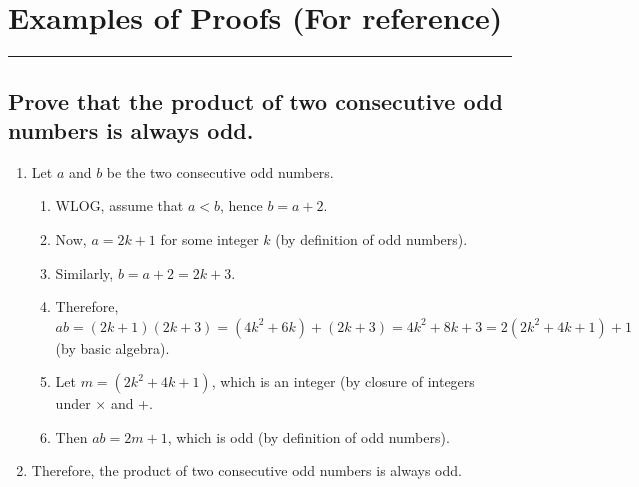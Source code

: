 \documentclass{article}
\begin{document}
\begin{description}
\end{description}

	 
\newpage
\begingroup

\renewcommand{\labelenumii}{\arabic{enumi}.\arabic{enumii}}
\renewcommand{\labelenumiii}{\arabic{enumi}.\arabic{enumii}.\arabic{enumiii}}
\renewcommand{\labelenumiv}{\arabic{enumi}.\arabic{enumii}.\arabic{enumiii}.\arabic{enumiv}}

\section*{Examples of Proofs (For reference)}
\hrule
\vspace{0.5cm}



\subsection*{Prove that the product of two consecutive odd numbers is always odd.}
\begin{enumerate}
    \item Let $a$ and $b$ be the two consecutive odd numbers. 
    \begin{enumerate}
        \item WLOG, assume that $a<b$, hence $b=a+2$.
        \item Now, $a=2k+1$ for some integer $k$ (by definition of odd numbers).
        \item Similarly, $b=a+2=2k+3$.
        \item Therefore, $ab=(2k+1)(2k+3)=(4k^2+6k)+(2k+3)=4k^2+8k+3=2(2k^2+4k+1)+1$ (by basic algebra).
        \item Let $m=(2k^2+4k+1)$, which is an integer (by closure of integers under $\times$ and +. 
        \item Then $ab=2m+1$, which is odd (by definition of odd numbers).
    \end{enumerate}
    \item Therefore, the product of two consecutive odd numbers is always odd.
\end{enumerate}
\vspace{0.1cm}
\end{document}
